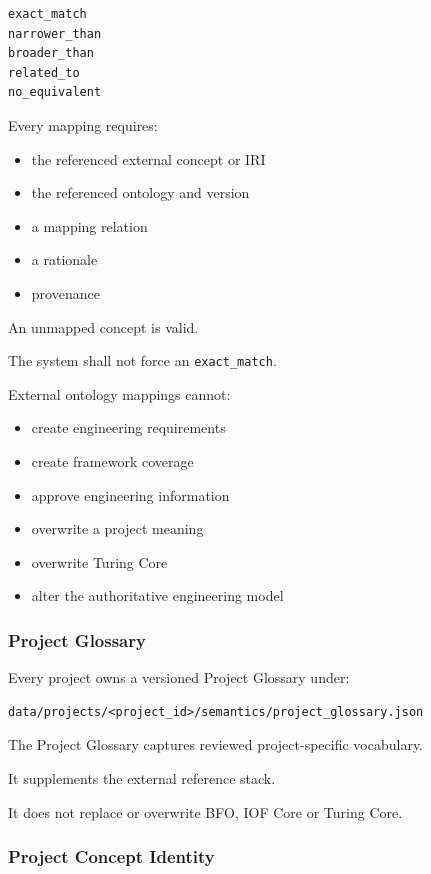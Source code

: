 \begin{verbatim}
exact_match
narrower_than
broader_than
related_to
no_equivalent
\end{verbatim}

Every mapping requires:

\begin{itemize}
\tightlist
\item
  the referenced external concept or IRI
\item
  the referenced ontology and version
\item
  a mapping relation
\item
  a rationale
\item
  provenance
\end{itemize}

An unmapped concept is valid.

The system shall not force an \texttt{exact\_match}.

External ontology mappings cannot:

\begin{itemize}
\tightlist
\item
  create engineering requirements
\item
  create framework coverage
\item
  approve engineering information
\item
  overwrite a project meaning
\item
  overwrite Turing Core
\item
  alter the authoritative engineering model
\end{itemize}

\hypertarget{project-glossary}{%
\subsubsection{Project Glossary}\label{project-glossary}}

Every project owns a versioned Project Glossary under:

\begin{verbatim}
data/projects/<project_id>/semantics/project_glossary.json
\end{verbatim}

The Project Glossary captures reviewed project-specific vocabulary.

It supplements the external reference stack.

It does not replace or overwrite BFO, IOF Core or Turing Core.

\hypertarget{project-concept-identity}{%
\subsubsection{Project Concept Identity}\label{project-concept-identity}}

